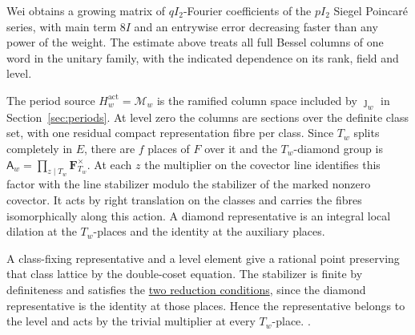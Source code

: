 Wei obtains a growing matrix of \(qI_2\)-Fourier coefficients of
the \(pI_2\) Siegel Poincar\'e series, with main term \(8I\) and
an entrywise error decreasing faster than any power of the weight.
\cite[Lemma~2.3 and \S3.1]{tr3wei-poincare}
The estimate above treats all full Bessel columns of one word
in the unitary family, with the indicated dependence on its rank,
field and level.

\leavevmode{}%
The period source \(H_w^{\mathrm{act}}=\mathcal M_w\) is the ramified
column space included by \(\jmath_w\) in Section~\ref{sec:periods}.
At level zero the columns are sections over the definite class set,
with one residual compact representation fibre per class. Since \(T_w\)
splits completely in \(E\), there are \(f\) places of \(F\) over it
and the \(T_w\)-diamond group is
\(\mathsf A_w=\prod_{z\mid T_w}\mathbf F_{T_w}^{\times}\).
At each \(z\) the multiplier on the covector line identifies this
factor with the line stabilizer modulo the stabilizer of the marked
nonzero covector.
It acts by right translation on the classes and carries the fibres
isomorphically along this action. A diamond representative is an
integral local dilation at the \(T_w\)-places and the identity at
the auxiliary places.

A class-fixing representative and a level element give a rational
point preserving that class lattice by the double-coset equation.
The stabilizer is finite by definiteness and satisfies the
\hyperlink{proof.two-level-stabilizers}{two reduction conditions},
since the diamond representative is the identity at those places.
Hence the representative belongs to the level and acts by the
trivial multiplier at every \(T_w\)-place.
.

